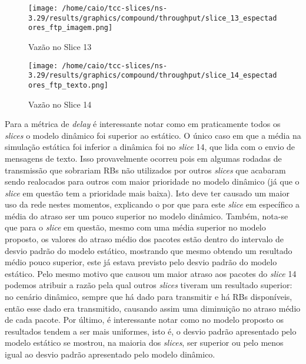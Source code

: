 \documentclass[12pt, a4paper]{article}
\begin{document}
\begin{figure}[H]
	\centering
	\texttt{[image: /home/caio/tcc-slices/ns-3.29/results/graphics/compound/throughput/slice\_13\_espectadores\_ftp\_imagem.png]}
	\caption{Vazão no Slice 13}
	\label{throughput13}
\end{figure}

\begin{figure}[H]
	\centering
	\texttt{[image: /home/caio/tcc-slices/ns-3.29/results/graphics/compound/throughput/slice\_14\_espectadores\_ftp\_texto.png]}
	\caption{Vazão no Slice 14}
	\label{throughput14}
\end{figure}

Para a métrica de \textit{delay} é interessante notar como em praticamente todos os \textit{slices} o modelo dinâmico foi superior ao estático. O único caso em que a média na simulação estática foi inferior a dinâmica foi no \textit{slice} 14, que lida com o envio de mensagens de texto. Isso provavelmente ocorreu pois em algumas rodadas de transmissão que sobrariam RBs não utilizados por outros \textit{slices} que acabaram sendo realocados para outros com maior prioridade no modelo dinâmico (já que o \textit{slice} em questão tem a prioridade mais baixa). Isto deve ter causado um maior uso da rede nestes momentos, explicando o por que para este \textit{slice} em específico a média do atraso ser um pouco superior no modelo dinâmico. Também, nota-se que para o \textit{slice} em questão, mesmo com uma média superior no modelo proposto, os valores do atraso médio dos pacotes estão dentro do intervalo de desvio padrão do modelo estático, mostrando que mesmo obtendo um resultado médio pouco superior, este já estava previsto pelo desvio padrão do modelo estático.  Pelo mesmo motivo que causou um maior atraso aos pacotes do \textit{slice} 14 podemos atribuir a razão pela qual outros \textit{slices} tiveram um resultado superior: no cenário dinâmico, sempre que há dado para transmitir e há RBs disponíveis, então esse dado era transmitido, causando assim uma diminuição no atraso médio de cada pacote. Por último, é interessante notar como no modelo proposto os resultados tendem a ser mais uniformes, isto é, o desvio padrão apresentado pelo modelo estático se mostrou, na maioria dos \textit{slices}, ser superior ou pelo menos igual ao desvio padrão apresentado pelo modelo dinâmico.
\end{document}
